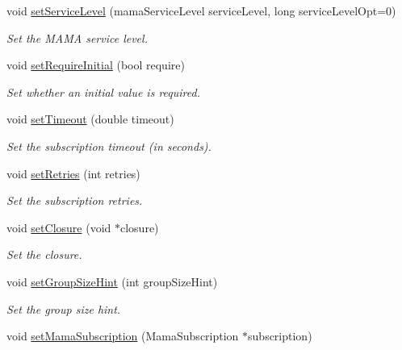 \begin{CompactItemize}
void \hyperlink{classWombat_1_1MamdaSubscription_673340d378cd6b402a22959a7343f897}{set\-Service\-Level} (mama\-Service\-Level service\-Level, long service\-Level\-Opt=0)
\begin{CompactList}\small\item\em Set the MAMA service level. \item\end{CompactList}\item 
void \hyperlink{classWombat_1_1MamdaSubscription_ded07ab7267ffb979524243134625b72}{set\-Require\-Initial} (bool require)
\begin{CompactList}\small\item\em Set whether an initial value is required. \item\end{CompactList}\item 
void \hyperlink{classWombat_1_1MamdaSubscription_72993f4d6d450f0bd6ccac8d8268eda9}{set\-Timeout} (double timeout)
\begin{CompactList}\small\item\em Set the subscription timeout (in seconds). \item\end{CompactList}\item 
void \hyperlink{classWombat_1_1MamdaSubscription_71be342e2ed8e1c561764618e84c441d}{set\-Retries} (int retries)
\begin{CompactList}\small\item\em Set the subscription retries. \item\end{CompactList}\item 
void \hyperlink{classWombat_1_1MamdaSubscription_e77b32a93840085a0b828e26b6159c77}{set\-Closure} (void $\ast$closure)
\begin{CompactList}\small\item\em Set the closure. \item\end{CompactList}\item 
void \hyperlink{classWombat_1_1MamdaSubscription_78825f659fcd432b49285e6eead8f9dd}{set\-Group\-Size\-Hint} (int group\-Size\-Hint)
\begin{CompactList}\small\item\em Set the group size hint. \item\end{CompactList}\item 
void \hyperlink{classWombat_1_1MamdaSubscription_d33d57b4dd870f3b7114af149ae1bb05}{set\-Mama\-Subscription} (Mama\-Subscription $\ast$subscription)

\end{CompactItemize}
